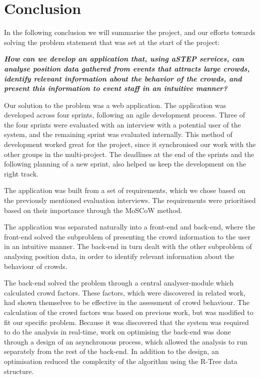 \chapter{Conclusion}\label{ch:conclusion}


In the following conclusion we will summarise the project, and our efforts towards solving the problem statement that was set at the start of the project:

\vspace{0.5 cm}
\begin{center}
	\textbf{\textit{How can we develop an application that, using aSTEP services, can analyse position data gathered from events that attracts large crowds, identify relevant information about the behavior of the crowds, and present this information to event staff in an intuitive manner?}}
\end{center}

Our solution to the problem was a web application. The application was developed across four sprints, following an agile development process. Three of the four sprints were evaluated with an interview with a potential user of the system, and the remaining sprint was evaluated internally. This method of development worked great for the project, since it synchronised our work with the other groups in the multi-project. The deadlines at the end of the sprints and the following planning of a new sprint, also helped us keep the development on the right track.

The application was built from a set of requirements, which we chose based on the previously mentioned evaluation interviews. The requirements were prioritised based on their importance through the MoSCoW method.

The application was separated naturally into a front-end and back-end, where the front-end solved the subproblem of presenting the crowd information to the user in an intuitive manner. The back-end in turn dealt with the other subproblem of analysing position data, in order to identify relevant information about the behaviour of crowds.

The back-end solved the problem through a central analyser-module which calculated crowd factors. These factors, which were discovered in related work, had shown themselves to be effective in the assessment of crowd behaviour. The calculation of the crowd factors was based on previous work, but was modified to fit our specific problem. Because it was discovered that the system was required to do the analysis in real-time, work on optimising the back-end was done through a design of an asynchronous process, which allowed the analysis to run separately from the rest of the back-end. In addition to the design, an optimisation reduced the complexity of the algorithm using the R-Tree data structure.


